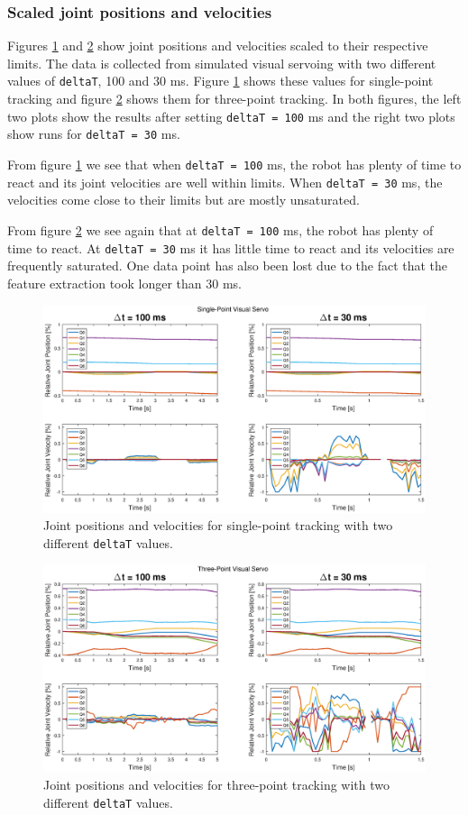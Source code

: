 \documentclass[]{scrartcl}
\begin{document}
\subsubsection*{Scaled joint positions and velocities}
Figures \ref{fig:onept} and \ref{fig:threept} show joint positions and velocities scaled to their respective limits. The data is collected from simulated visual servoing with two different values of \texttt{deltaT}, 100 and 30 ms. Figure \ref{fig:onept} shows these values for single-point tracking and figure \ref{fig:threept} shows them for three-point tracking. In both figures, the left two plots show the results after setting \texttt{deltaT = 100} ms and the right two plots show runs for \texttt{deltaT = 30} ms.\par
From figure \ref{fig:onept} we see that when \texttt{deltaT = 100} ms, the robot has plenty of time to react and its joint velocities are well within limits. When \texttt{deltaT = 30} ms, the velocities come close to their limits but are mostly unsaturated. \par
From figure \ref{fig:threept} we see again that at \texttt{deltaT = 100} ms, the robot has plenty of time to react. At \texttt{deltaT = 30} ms it has little time to react and its velocities are frequently saturated. One data point has also been lost due to the fact that the feature extraction took longer than 30 ms.\par
\begin{figure}
	\centering
	\includegraphics[width=1\linewidth, trim = 75 0 75 0]{fig/onept.eps}
	\caption{Joint positions and velocities for single-point tracking with two different \texttt{deltaT} values.}
	\label{fig:onept}
\end{figure}
\begin{figure}
	\centering
	\includegraphics[width=1\linewidth, trim = 75 0 75 0]{fig/threept.eps}
	\caption{Joint positions and velocities for three-point tracking with two different \texttt{deltaT} values.}
	\label{fig:threept}
\end{figure}
\end{document}
